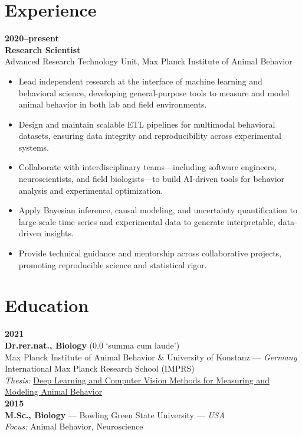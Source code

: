 \documentclass[10pt,letterpaper]{article}
\begin{document}
\section*{Experience}
\textbf{2020--present}\\
\textbf{Research Scientist}\\
Advanced Research Technology Unit, Max Planck Institute of Animal Behavior
\begin{itemize}
	\item Lead independent research at the interface of machine learning and behavioral science, developing general-purpose tools to measure and model animal behavior in both lab and field environments.
	\item Design and maintain scalable ETL pipelines for multimodal behavioral datasets, ensuring data integrity and reproducibility across experimental systems.
	\item Collaborate with interdisciplinary teams—including software engineers, neuroscientists, and field biologists—to build AI-driven tools for behavior analysis and experimental optimization.
	\item Apply Bayesian inference, causal modeling, and uncertainty quantification to large-scale time series and experimental data to generate interpretable, data-driven insights.
	\item Provide technical guidance and mentorship across collaborative projects, promoting reproducible science and statistical rigor.
\end{itemize}

\section*{Education}

\textbf{2021} \\
\textbf{Dr.rer.nat., Biology} (0.0 ‘summa cum laude’) \\
Max Planck Institute of Animal Behavior \& University of Konstanz — \textit{Germany} \\
International Max Planck Research School (IMPRS) \\
\textit{Thesis:} \href{http://nbn-resolving.de/urn:nbn:de:bsz:352-2-dgcbudqch6ix8}{Deep Learning and Computer Vision Methods for Measuring and Modeling Animal Behavior} \\
\newpage
\textbf{2015} \\
\textbf{M.Sc., Biology} — Bowling Green State University — \textit{USA} \\
\textit{Focus:} Animal Behavior, Neuroscience \\
\end{document}
